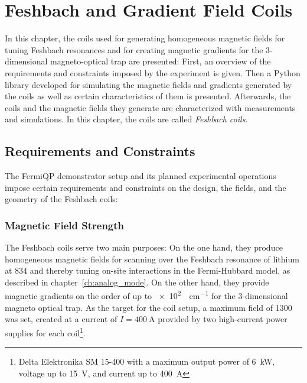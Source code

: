 \renewcommand{\imagepath}{../40-coils/img}

\chapter{Feshbach and Gradient Field Coils}\label{ch:coils}
In this chapter, the coils used for generating homogeneous magnetic fields for tuning Feshbach resonances and for creating magnetic gradients for the 3-dimensional magneto-optical trap are presented: First, an overview of the requirements and constraints imposed by the experiment is given. Then a Python library developed for simulating the magnetic fields and gradients generated by the coils as well as certain characteristics of them is presented. Afterwards, the coils and the magnetic fields they generate are characterized with measurements and simulations. In this chapter, the coils are called \textit{Feshbach coils}.

\section{Requirements and Constraints}
The FermiQP demonstrator setup and its planned experimental operations impose certain requirements and constraints on the design, the fields, and the geometry of the Feshbach coils:

\subsection*{Magnetic Field Strength}
The Feshbach coils serve two main purposes: On the one hand, they produce homogeneous magnetic fields for scanning over the Feshbach resonance of lithium at \SI{834}{\gauss} and thereby tuning on-site interactions in the Fermi-Hubbard model, as described in chapter~\ref{ch:analog_mode}. On the other hand, they provide magnetic gradients on the order of up to \SI[]{e2}{\gauss\per\centi\meter} for the 3-dimensional magneto optical trap. As the target for the coil setup, a maximum field of \SI{1300}{\gauss} was set, created at a current of $I = \SI{400}{\ampere}$ provided by two high-current power supplies for each coil\footnote{Delta Elektronika SM 15-400 with a maximum output power of \SI[]{6}{\kilo\watt}, voltage up to \SI[]{15}{\volt}, and current up to \SI[]{400}{\ampere}}.

